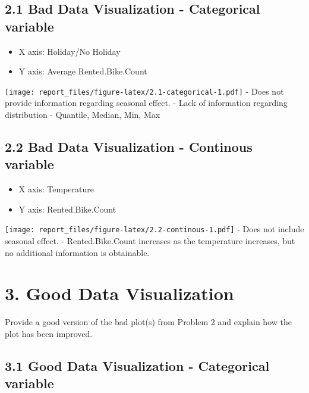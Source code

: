 \documentclass[
]{article}
\providecommand{\tightlist}{%
  \setlength{\itemsep}{0pt}\setlength{\parskip}{0pt}}
\begin{document}
\hypertarget{bad-data-visualization---categorical-variable}{%
\subsection{2.1 Bad Data Visualization - Categorical
variable}\label{bad-data-visualization---categorical-variable}}

\begin{itemize}
\tightlist
\item
  X axis: Holiday/No Holiday
\item
  Y axis: Average Rented.Bike.Count
\end{itemize}

\texttt{[image: report\_files/figure-latex/2.1-categorical-1.pdf]} - Does
not provide information regarding seasonal effect. - Lack of information
regarding distribution - Quantile, Median, Min, Max

\hypertarget{bad-data-visualization---continous-variable}{%
\subsection{2.2 Bad Data Visualization - Continous
variable}\label{bad-data-visualization---continous-variable}}

\begin{itemize}
\tightlist
\item
  X axis: Temperature
\item
  Y axis: Rented.Bike.Count
\end{itemize}

\texttt{[image: report\_files/figure-latex/2.2-continous-1.pdf]} - Does
not include seasonal effect. - Rented.Bike.Count increases as the
temperature increases, but no additional information is obtainable.

\hypertarget{good-data-visualization}{%
\section{3. Good Data Visualization}\label{good-data-visualization}}

Provide a good version of the bad plot(s) from Problem 2 and explain how
the plot has been improved.

\hypertarget{good-data-visualization---categorical-variable}{%
\subsection{3.1 Good Data Visualization - Categorical
variable}\label{good-data-visualization---categorical-variable}}
\end{document}
